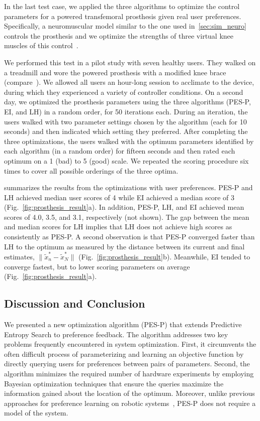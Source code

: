 In the last test case, we applied the three algorithms to optimize the control
parameters for a powered transfemoral prosthesis given real user preferences.
Specifically, a neuromuscular model similar to the one used
in~\cref{sec:sim_neuro} controls the prosthesis and we optimize the strengths
of three virtual knee muscles of this control~\citep{thatte2016toward}. 

We performed this test in a pilot study with seven healthy users. They walked
on a treadmill and wore the powered prosthesis with a modified knee brace
(compare~\citep{thatte2016toward}). We allowed all users an hour-long session to
acclimate to the device, during which they experienced a variety of controller
conditions. On a second day, we optimized the prosthesis parameters using the
three algorithms (PES-P, EI, and LH) in a random order, for 50 iterations each.
During an iteration, the users walked with two parameter settings chosen by the
algorithm (each for 10 seconds) and then indicated which setting they
preferred. After completing the three optimizations, the users walked with the
optimum parameters identified by each algorithm (in a random order) for fifteen
seconds and then rated each optimum on a 1 (bad) to 5 (good) scale. We repeated
the scoring procedure six times to cover all possible orderings of the three
optima.

 summarizes the results from the optimizations with
user preferences. PES-P and LH achieved median user scores of 4 while EI
achieved a median score of 3 (Fig.~\ref{fig:prosthesis_result}a). In addition,
PES-P, LH, and EI achieved mean scores of 4.0, 3.5, and 3.1, respectively (not
shown). The gap between the mean and median scores for LH implies that LH does
not achieve high scores as consistently as PES-P. A second observation is that
PES-P converged faster than LH to the optimum as measured by the distance
between its current and final estimates, $\lVert \tilde{x}_n^* - \tilde{x}_N^*
\rVert$ (Fig.~\ref{fig:prosthesis_result}b).  Meanwhile, EI tended to converge
fastest, but to lower scoring parameters on average
(Fig.~\ref{fig:prosthesis_result}a).

\subsection{Discussion and Conclusion}\label{sec:tuning_discussion}
We presented a new optimization algorithm (PES-P) that extends Predictive
Entropy Search to preference feedback. The algorithm addresses two key problems
frequently encountered in system optimization. First, it circumvents the often
difficult process of parameterizing and learning an objective function by
directly querying users for preferences between pairs of parameters. Second, the
algorithm minimizes the required number of hardware experiments by employing
Bayesian optimization techniques that ensure the queries maximize the
information gained about the location of the optimum. Moreover, unlike previous
approaches for preference learning on robotic systems~\citep{wilson2012bayesian,
jain2013learning}, PES-P does not require a model of the system.

